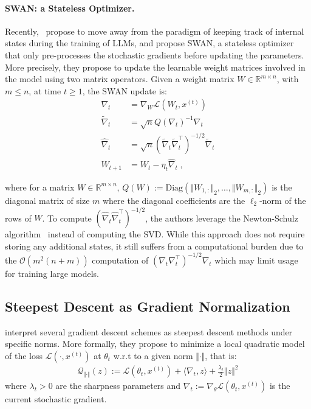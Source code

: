 \paragraph{SWAN: a Stateless Optimizer.} Recently,~\citet{ma2024swansgdnormalizationwhitening} propose to move away from the paradigm of keeping track of internal states during the training of LLMs, and propose SWAN, a stateless optimizer that only pre-processes the stochastic gradients before updating the parameters. More precisely, they propose
to update the learnable weight matrices involved in the model using two matrix operators. Given a weight matrix $W\in\mathbb{R}^{m\times n}$, with $m\leq n$, at time $t\geq 1$, the SWAN update is:
\begin{equation}
\begin{aligned}
\label{eq:swan-update}
    \nabla_t &= \nabla_W \mathcal{L}(W_t,  x^{(t)})\\
    \tilde{\nabla}_t &=\sqrt{n} Q(\nabla_t)^{-1}\nabla_t\\
    \hat{\nabla}_t &=  \sqrt{n}(\tilde{\nabla}_t\tilde{\nabla}_t^\top)^{-1/2}\tilde{\nabla}_t\\
    W_{t+1}&= W_t - \eta_t  \hat{\nabla}_t\; , 
\end{aligned}
\end{equation}

where for a matrix $W\in\mathbb{R}^{m\times n}$, $Q(W):=\text{Diag}(\Vert W_{1,:}\Vert_2, \dots, \Vert W_{m,:}\Vert_2)$ is the diagonal matrix of size $m$ where the diagonal coefficients are the $\ell_2$-norm of the rows of $W$. To compute $(\hat{\nabla}_t\hat{\nabla}_t^\top)^{-1/2}$, the authors leverage the Newton-Schulz algorithm~\citep{song2022fast, li2018towards, huang2019iterative} instead of computing the SVD. While this approach does not require storing any additional states, it still suffers from a computational burden due to the $\mathcal{O}( m^2(n+m))$ computation of $(\nabla_t\nabla_t^\top)^{-1/2}\nabla_t$ which may limit usage for training large models.

\subsection{Steepest Descent as Gradient Normalization}
\label{sec:single-norm}
\citet{bernstein2024old} interpret several gradient descent schemes as steepest descent methods under specific norms. More formally, they propose to minimize a local quadratic model of the loss $\mathcal{L}(\cdot,x^{(t)})$ at $\theta_t$ w.r.t to a given norm $\Vert \cdot \Vert$, that is:
\begin{align*}
   \mathcal{Q}_{\Vert\cdot\Vert}(z):=\mathcal{L}(\theta_t, x^{(t)}) +\langle \nabla_t, z\rangle + \frac{\lambda_t}{2} \Vert z \Vert^2 
\end{align*}
where $\lambda_t>0$ are the sharpness parameters and $\nabla_t:=\nabla_{\theta} \mathcal{L}(\theta_t, x^{(t)})$ is the current stochastic gradient. 


